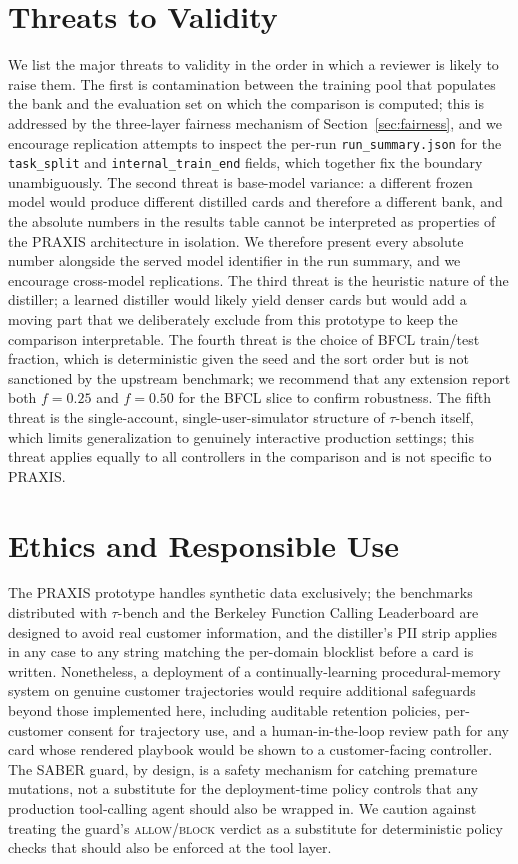 \documentclass[conference]{IEEEtran}
\begin{document}
\section{Threats to Validity}

We list the major threats to validity in the order in which a
reviewer is likely to raise them. The first is contamination
between the training pool that populates the bank and the
evaluation set on which the comparison is computed; this is
addressed by the three-layer fairness mechanism of
Section~\ref{sec:fairness}, and we encourage replication attempts
to inspect the per-run \texttt{run\_summary.json} for the
\texttt{task\_split} and \texttt{internal\_train\_end} fields,
which together fix the boundary unambiguously. The second threat
is base-model variance: a different frozen model would produce
different distilled cards and therefore a different bank, and the
absolute numbers in the results table cannot be interpreted as
properties of the PRAXIS architecture in isolation. We therefore
present every absolute number alongside the served model
identifier in the run summary, and we encourage cross-model
replications. The third threat is the heuristic nature of the
distiller; a learned distiller would likely yield denser cards
but would add a moving part that we deliberately exclude from
this prototype to keep the comparison interpretable. The fourth
threat is the choice of BFCL train/test fraction, which is
deterministic given the seed and the sort order but is not
sanctioned by the upstream benchmark; we recommend that any
extension report both $f = 0.25$ and $f = 0.50$ for the BFCL
slice to confirm robustness. The fifth threat is the
single-account, single-user-simulator structure of $\tau$-bench
itself, which limits generalization to genuinely interactive
production settings; this threat applies equally to all controllers
in the comparison and is not specific to PRAXIS.

\section{Ethics and Responsible Use}

The PRAXIS prototype handles synthetic data exclusively; the
benchmarks distributed with $\tau$-bench and the Berkeley
Function Calling Leaderboard are designed to avoid real customer
information, and the distiller's PII strip applies in any case to
any string matching the per-domain blocklist before a card is
written. Nonetheless, a deployment of a continually-learning
procedural-memory system on genuine customer trajectories would
require additional safeguards beyond those implemented here,
including auditable retention policies, per-customer consent for
trajectory use, and a human-in-the-loop review path for any card
whose rendered playbook would be shown to a customer-facing
controller. The SABER guard, by design, is a safety mechanism for
catching premature mutations, not a substitute for the
deployment-time policy controls that any production tool-calling
agent should also be wrapped in. We caution against treating the
guard's \textsc{allow}/\textsc{block} verdict as a substitute for
deterministic policy checks that should also be enforced at the
tool layer.
\end{document}
